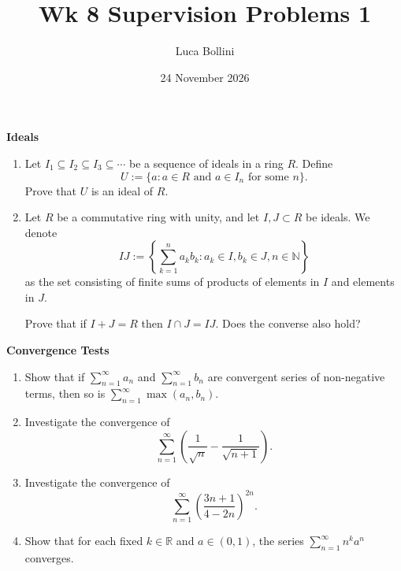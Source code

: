 \documentclass{article}
\title{Wk 8 Supervision Problems 1}
\author{Luca Bollini}
\date{24 November 2026}
\newcommand{\N}{\mathbb{N}}
\newcommand{\R}{\mathbb{R}}
\newcommand{\series}{\sum_{n=1}^\infty}
\begin{document}
\maketitle

\begin{center}
\huge{\textbf{Ideals}}
\end{center}

\begin{enumerate}
    \item Let $I_1\subseteq I_2\subseteq I_3\subseteq\cdots$ be a sequence of ideals in a ring $R$. Define
    \[
    U := \{a: a\in R\text{ and } a\in I_n \text{ for some } n\}.
    \]
    Prove that $U$ is an ideal of $R$.
    \item Let $R$ be a commutative ring with unity, and let $I,J\subset R$ be ideals.
    We denote
    \[
    IJ:= \left\{\sum_{k=1}^n a_kb_k : a_k\in I, b_k\in J, n\in\N\right\}
    \]
    as the set consisting of finite sums of products of elements in $I$ and elements in $J$.
    
    Prove that if $I+J=R$ then $I\cap J=IJ$. Does the converse also hold?
\end{enumerate}

\begin{center}
\huge{\textbf{Convergence Tests}}
\end{center}

\begin{enumerate}
    \item Show that if $\series a_n$ and $\series b_n$ are convergent series of non-negative terms, then so is $\series\max(a_n,b_n)$.
    \item Investigate the convergence of
    \[
    \series \left(\frac1{\sqrt{n}}-\frac1{\sqrt{n+1}}\right).
    \]
    \item Investigate the convergence of
    \[
    \series \left(\frac{3n+1}{4-2n}\right)^{2n}.
    \]
    \item Show that for each fixed $k\in\R$ and $a\in(0,1)$, the series $\series n^k a^n$ converges.
\end{enumerate}
\end{document}
